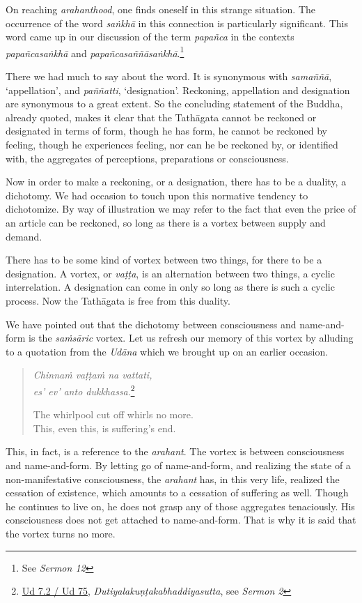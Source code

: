 On reaching \emph{arahanthood}, one finds oneself in this strange situation. The occurrence of the word \emph{saṅkhā} in this connection is particularly significant. This word came up in our discussion of the term \emph{papañca} in the contexts \emph{papañcasaṅkhā} and \emph{papañcasaññāsaṅkhā}.\footnote{See \emph{Sermon 12}}

There we had much to say about the word. It is synonymous with \emph{samaññā}, `appellation', and \emph{paññatti}, `designation'. Reckoning, appellation and designation are synonymous to a great extent. So the concluding statement of the Buddha, already quoted, makes it clear that the Tathāgata cannot be reckoned or designated in terms of form, though he has form, he cannot be reckoned by feeling, though he experiences feeling, nor can he be reckoned by, or identified with, the aggregates of perceptions, preparations or consciousness.

Now in order to make a reckoning, or a designation, there has to be a duality, a dichotomy. We had occasion to touch upon this normative tendency to dichotomize. By way of illustration we may refer to the fact that even the price of an article can be reckoned, so long as there is a vortex between supply and demand.

There has to be some kind of vortex between two things, for there to be a designation. A vortex, or \emph{vaṭṭa}, is an alternation between two things, a cyclic interrelation. A designation can come in only so long as there is such a cyclic process. Now the Tathāgata is free from this duality.

We have pointed out that the dichotomy between consciousness and name-and-form is the \emph{saṁsāric} vortex. Let us refresh our memory of this vortex by alluding to a quotation from the \emph{Udāna} which we brought up on an earlier occasion.

\begin{quote}
\emph{Chinnaṁ vaṭṭaṁ na vattati,}\\
\emph{es' ev' anto dukkhassa}.\footnote{\href{https://suttacentral.net/ud7.2/pli/ms}{Ud 7.2 / Ud 75}, \emph{Dutiyalakuṇṭakabhaddiyasutta}, see \emph{Sermon 2}}

The whirlpool cut off whirls no more.\\
This, even this, is suffering's end.
\end{quote}

This, in fact, is a reference to the \emph{arahant}. The vortex is between consciousness and name-and-form. By letting go of name-and-form, and realizing the state of a non-manifestative consciousness, the \emph{arahant} has, in this very life, realized the cessation of existence, which amounts to a cessation of suffering as well. Though he continues to live on, he does not grasp any of those aggregates tenaciously. His consciousness does not get attached to name-and-form. That is why it is said that the vortex turns no more.

